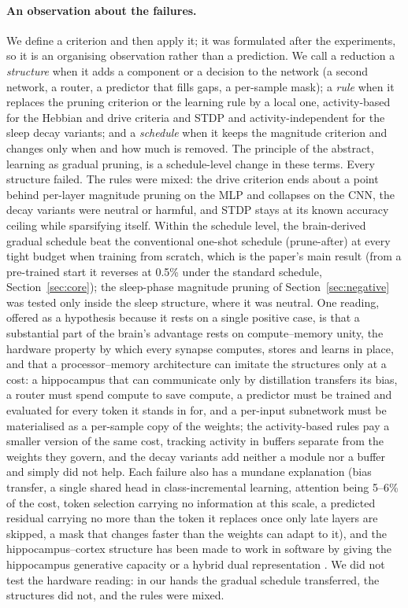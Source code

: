 \documentclass[11pt]{article}
\begin{document}
\paragraph{An observation about the failures.} We define a criterion and then apply it; it was formulated after the
experiments, so it is an organising observation rather than a prediction. We call a reduction a \emph{structure} when it
adds a component or a decision to the network (a second network, a router, a predictor that fills gaps, a per-sample mask);
a \emph{rule} when it replaces the pruning criterion or the learning rule by a local one, activity-based for the Hebbian and
drive criteria and STDP and activity-independent for the sleep decay variants; and a \emph{schedule} when it keeps the
magnitude criterion and changes only when and how much is removed. The principle of the abstract, learning as gradual pruning, is a schedule-level change in
these terms. Every structure failed. The rules were mixed: the drive criterion ends about a point behind per-layer magnitude
pruning on the MLP and collapses on the CNN, the decay variants were neutral or harmful, and STDP stays at its known
accuracy ceiling while sparsifying itself. Within the schedule level, the brain-derived gradual schedule beat the
conventional one-shot schedule (prune-after) at every tight budget when training from scratch, which is the paper's main
result (from a pre-trained start it reverses at 0.5\% under the standard schedule, Section~\ref{sec:core}); the sleep-phase
magnitude pruning of Section~\ref{sec:negative} was tested only inside the sleep structure, where it was neutral. One reading, offered as a hypothesis because it rests on a single positive case, is that a substantial
part of the brain's advantage rests on compute--memory unity, the hardware property by which every synapse computes, stores
and learns in place, and that a processor--memory architecture can imitate the structures only at a cost: a hippocampus
that can communicate only by distillation transfers its bias, a router must spend compute to save compute, a predictor must
be trained and evaluated for every token it stands in for, and a per-input subnetwork must be materialised as a per-sample
copy of the weights; the activity-based rules pay a smaller version of the same cost, tracking activity in buffers separate
from the weights they govern, and the decay variants add neither a module nor a buffer and simply did not help. Each failure also has a mundane explanation (bias transfer, a single shared head in class-incremental
learning, attention being 5--6\% of the cost, token selection carrying no information at this scale, a predicted residual
carrying no more than the token it replaces once only late layers are skipped, a mask that changes faster than the weights
can adapt to it), and the hippocampus--cortex structure has been made to work in software by giving the hippocampus
generative capacity or a hybrid dual representation \citep{vandeven2020,shi2025}. We did not test the hardware reading: in
our hands the gradual schedule transferred, the structures did not, and the rules were mixed.
\end{document}
